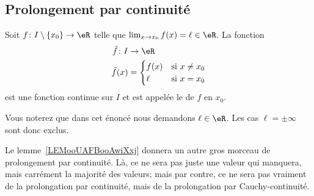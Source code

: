 \subsection{Prolongement par continuité}

\begin{propositionDef}
	Soit \( f\colon I\setminus\{ x_0 \}\to \eR\) telle que \( \lim_{x\to x_{0}} f(x)=\ell\in \eR\). La fonction
	\begin{equation}
		\begin{aligned}
			\tilde f\colon I & \to \eR                      \\
			\tilde f(x)      & =\begin{cases}
				                    f(x) & \text{si } x\neq x_0 \\
				                    \ell & \text{si } x=x_0
			                    \end{cases}
		\end{aligned}
	\end{equation}
	est une fonction continue sur \( I\) et est appelée le  de \( f\) en \( x_0\).
\end{propositionDef}
Vous noterez que dans cet énoncé nous demandons \( \ell\in \eR\). Les cas \( \ell=\pm\infty\) sont donc exclus.

\begin{normaltext}
	Le lemme~\ref{LEMooUAFBooAwiXxj} donnera un autre gros morceau de prolongement par continuité. Là, ce ne sera pas juste une valeur qui manquera, mais carrément la majorité des valeurs; mais par contre, ce ne sera pas vraiment de la prolongation par continuité, mais de la prolongation par Cauchy-continuité.
\end{normaltext}

